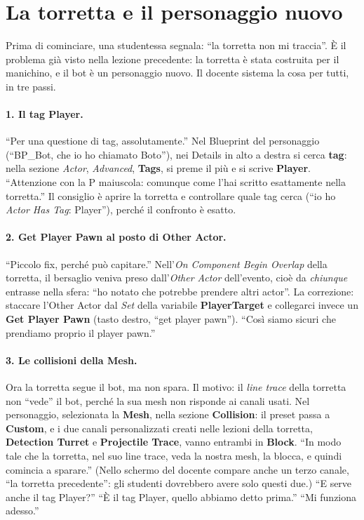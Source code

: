 \section{La torretta e il personaggio nuovo}
\label{ue11:sec:torretta}

Prima di cominciare, una studentessa segnala: ``la torretta non mi traccia''. È il
problema già visto nella lezione precedente: la torretta è stata costruita per il
manichino, e il bot è un personaggio nuovo. Il docente sistema la cosa per tutti, in tre
passi.

\paragraph{1. Il tag Player.} ``Per una questione di tag, assolutamente.'' Nel Blueprint
del personaggio (``BP\_Bot, che io ho chiamato Boto''), nei Details in alto a destra si
cerca \textbf{tag}: nella sezione \emph{Actor}, \emph{Advanced}, \textbf{Tags}, si preme
il più e si scrive \textbf{Player}. ``Attenzione con la P maiuscola: comunque come l'hai
scritto esattamente nella torretta.'' Il consiglio è aprire la torretta e controllare
quale tag cerca (``io ho \emph{Actor Has Tag}: Player''), perché il confronto è esatto.

\paragraph{2. Get Player Pawn al posto di Other Actor.} ``Piccolo fix, perché può
capitare.'' Nell'\emph{On Component Begin Overlap} della torretta, il bersaglio veniva
preso dall'\emph{Other Actor} dell'evento, cioè da \emph{chiunque} entrasse nella sfera:
``ho notato che potrebbe prendere altri actor''. La correzione: staccare l'Other Actor
dal \emph{Set} della variabile \textbf{PlayerTarget} e collegarci invece un \textbf{Get
Player Pawn} (tasto destro, ``get player pawn''). ``Così siamo sicuri che prendiamo
proprio il player pawn.''

\paragraph{3. Le collisioni della Mesh.} Ora la torretta segue il bot, ma non spara. Il
motivo: il \emph{line trace} della torretta non ``vede'' il bot, perché la sua mesh non
risponde ai canali usati. Nel personaggio, selezionata la \textbf{Mesh}, nella sezione
\textbf{Collision}: il preset passa a \textbf{Custom}, e i due canali personalizzati creati
nelle lezioni della torretta, \textbf{Detection Turret} e \textbf{Projectile Trace}, vanno
entrambi in \textbf{Block}. ``In modo tale che la torretta, nel suo line trace, veda la
nostra mesh, la blocca, e quindi comincia a sparare.'' (Nello schermo del docente compare
anche un terzo canale, ``la torretta precedente'': gli studenti dovrebbero avere solo
questi due.) ``E serve anche il tag Player?'' ``È il tag Player, quello abbiamo detto
prima.'' ``Mi funziona adesso.''

